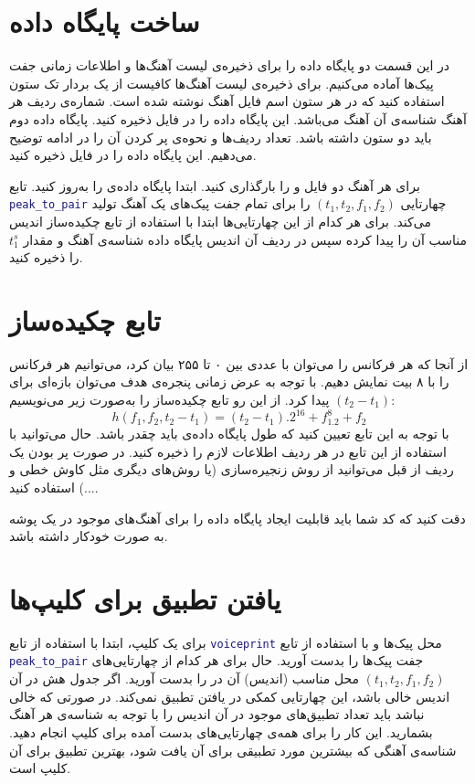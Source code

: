 \documentclass{utsignal}
\begin{document}
	\section{ساخت پایگاه داده}
	در این قسمت دو پایگاه داده را برای ذخیره‌ی لیست آهنگ‌ها و اطلاعات زمانی جفت پیک‌ها آماده می‌کنیم. برای ذخیره‌ی لیست آهنگ‌ها کافیست از یک بردار تک ستون استفاده کنید که در هر ستون اسم فایل آهنگ نوشته شده است. شماره‌ی ردیف هر آهنگ شناسه‌ی آن آهنگ می‌باشد. این پایگاه داده را در فایل  ذخیره کنید. پایگاه داده دوم  باید دو ستون داشته باشد. تعداد ردیف‌ها و نحوه‌ی پر کردن آن را در ادامه توضیح می‌دهیم. این پایگاه داده را در فایل  ذخیره کنید. 
	
	برای هر آهنگ دو فایل  و  را بارگذاری کنید. ابتدا پایگاه داده‌ی  را به‌روز کنید. تابع \lstinline[language=Matlab]{peak_to_pair} چهارتایی $(t_1, t_2, f_1, f_2)$ را برای تمام جفت پیک‌های یک آهنگ تولید می‌کند. برای هر کدام از این چهار‌تایی‌ها ابتدا با استفاده از تابع چکیده‌ساز اندیس  مناسب آن را پیدا کرده سپس در ردیف آن اندیس پایگاه داده  شناسه‌ی آهنگ و مقدار $t_1^s$ را ذخیره کنید.
	
	\section{تابع چکیده‌ساز}
	از آنجا که هر فرکانس را می‌توان با عددی بین ۰ تا ۲۵۵ بیان کرد، می‌توانیم هر فرکانس را با ۸ بیت نمایش دهیم. با توجه‌ به عرض زمانی پنجره‌ی هدف می‌توان بازه‌ای برای $(t_2-t_1)$ پیدا کرد. از این رو تابع چکیده‌ساز را به‌صورت زیر می‌نویسیم:
	$$h(f_1, f_2, t_2-t_1) = (t_2-t_1).2^{16} + f_1.2^8 + f_2$$
	با توجه به این تابع تعیین کنید که طول پایگاه داده‌ی  باید چقدر باشد. حال می‌توانید با استفاده از این تابع در هر ردیف اطلاعات لازم را ذخیره کنید. در صورت پر بودن یک ردیف از قبل می‌توانید از روش زنجیره‌سازی (یا روش‌های دیگری مثل کاوش خطی و ...) استفاده کنید.
	
	دقت کنید که کد شما باید قابلیت ایجاد پایگاه‌ داده را برای آهنگ‌های موجود در یک پوشه به صورت خودکار داشته باشد.
	
	\section{یافتن تطبیق برای کلیپ‌ها}
	برای یک کلیپ، ابتدا با استفاده از تابع \lstinline[language=Matlab]{voiceprint} محل پیک‌ها و با استفاده از تابع \lstinline[language=Matlab]{peak_to_pair} جفت پیک‌ها را بدست آورید. حال برای هر کدام از چهارتایی‌های $(t_1, t_2, f_1, f_2)$ محل مناسب (اندیس) آن در  را بدست آورید. اگر جدول هش در آن اندیس خالی باشد، این چهارتایی کمکی در یافتن تطبیق نمی‌کند. در صورتی که خالی نباشد باید تعداد تطبیق‌های موجود در آن اندیس را با توجه به شناسه‌ی هر آهنگ بشمارید. این کار را برای همه‌ی چهارتایی‌های بدست آمده برای کلیپ انجام دهید. شناسه‌ی آهنگی که بیشترین مورد تطبیقی برای آن یافت شود، بهترین تطبیق برای آن کلیپ است.
	
\end{document}
